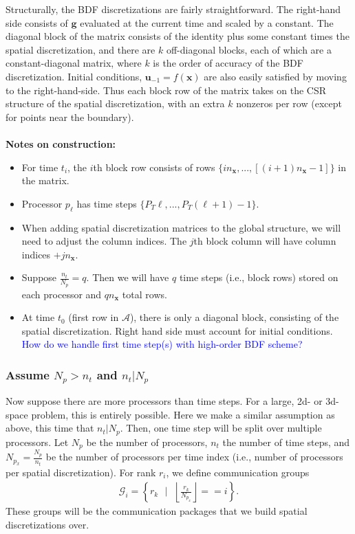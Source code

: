 \documentclass[a4paper,12pt]{article}
\newcommand{\tcb}{\textcolor{blue}}
\begin{document}
Structurally, the BDF discretizations are fairly straightforward. The right-hand side consists of $\mathbf{g}$ evaluated at the current time
and scaled by a constant. The diagonal block of the matrix consists of the identity plus some constant times the spatial discretization, and
there are $k$ off-diagonal blocks, each of which are a constant-diagonal matrix, where $k$ is the order of accuracy of the BDF discretization. 
Initial conditions, $\mathbf{u}_{-1} = f(\mathbf{x})$ are also easily satisfied by moving to the right-hand-side. Thus each block row of the matrix
takes on the CSR structure of the spatial discretization, with an extra $k$ nonzeros per row (except for points near the boundary).\\
\\
\noindent\textbf{Notes on construction:}
\begin{itemize}
\item For time $t_i$, the $i$th block row consists of rows $\{in_{\mathbf{x}}, ...,[(i+1)n_{\mathbf{x}}-1]\}$ in the matrix. 
\item Processor $p_{\ell}$ has time steps $\{P_T\ell,...,P_T(\ell+1)-1\}$. 
\item When adding spatial discretization matrices to the global structure, we will need to adjust the column indices. The $j$th block column
will have column indices $+jn_{\mathbf{x}}$. 
\item Suppose $\frac{n_t}{N_p} = q$. Then we will have $q$ time steps (i.e., block rows) stored on each processor and $qn_{\mathbf{x}}$
total rows. 
\item At time $t_0$ (first row in $\mathcal{A}$), there is only a diagonal block, consisting of the spatial discretization. Right hand side must
account for initial conditions. \tcb{How do we handle first time step(s) with high-order BDF scheme?}

\end{itemize}


\subsubsection{Assume $N_p > n_t$ and $n_t | N_p$}

Now suppose there are more processors than time steps. For a large, 2d- or 3d-space problem, this is entirely possible.
Here we make a similar assumption as above, this time that $n_t | N_p$. Then, one time step will be split over multiple
processors. Let $N_p$ be the number of processors, $n_t$ the number of time steps, and $N_{p_x} = \frac{N_p}{n_t}$
be the number of processors per time index (i.e., number of processors per spatial discretization). For rank $r_i$, we
define communication groups 
\begin{align*}
\mathcal{G}_i = \left\{r_k \text{ $\Big|$ } \left\lfloor \frac{r_k}{N_{p_x}} \right\rfloor == i\right\}.
\end{align*}
These groups will be the communication packages that we build spatial discretizations over. 
\end{document}

